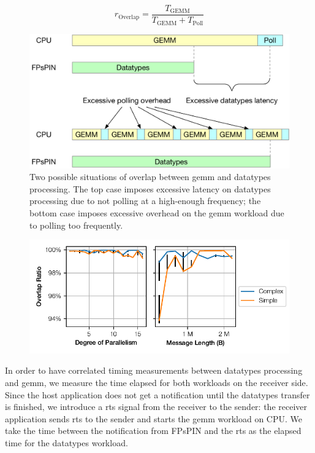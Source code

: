 \[
r_\text{Overlap} = \frac{T_{\text{GEMM}}}{T_{\text{GEMM}} + T_{\text{Poll}}}
\]

\begin{figure}[tp]
    \centering
    \includegraphics[width=.8\textwidth]{thesis/figures/datatypes-tune-goal.pdf}
    \caption{Two possible situations of overlap between \ac{gemm} and datatypes processing.  The top case imposes excessive latency on datatypes processing due to not polling at a high-enough frequency; the bottom case imposes excessive overhead on the \ac{gemm} workload due to polling too frequently.} \label{fig:datatypes-tuning-goal}
\end{figure}

\begin{figure}[tp]
    \centering
    \includegraphics{thesis/figures/datatypes-overlap.pdf}
    \caption{} \label{fig:datatypes-overlap}
\end{figure}

In order to have correlated timing measurements between datatypes processing and \ac{gemm}, we measure the time elapsed for both workloads on the receiver side.  Since the host application does not get a notification until the datatypes transfer is finished, we introduce a \ac{rts} signal from the receiver to the sender: the receiver application sends \ac{rts} to the sender and starts the \ac{gemm} workload on CPU.  We take the time between the notification from FPsPIN and the \ac{rts} as the elapsed time for the datatypes workload.

